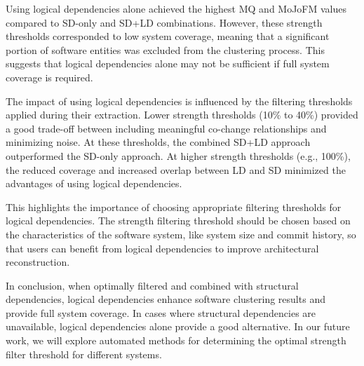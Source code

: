 \documentclass{ieeeaccess}
\begin{document}
Using logical dependencies alone achieved the highest MQ and MoJoFM values compared to SD-only and SD+LD combinations. However, these strength thresholds corresponded to low system coverage, meaning that a significant portion of software entities was excluded from the clustering process. This suggests that logical dependencies alone may not be sufficient if full system coverage is required.

The impact of using logical dependencies is influenced by the filtering thresholds applied during their extraction. Lower strength thresholds (10\% to 40\%) provided a good trade-off between including meaningful co-change relationships and minimizing noise. At these thresholds, the combined SD+LD approach outperformed the SD-only approach. At higher strength thresholds (e.g., 100\%), the reduced coverage and increased overlap between LD and SD minimized the advantages of using logical dependencies.

This highlights the importance of choosing appropriate filtering thresholds for logical dependencies. The strength filtering threshold should be chosen based on the characteristics of the software system, like system size and commit history, so that users can benefit from logical dependencies to improve architectural reconstruction.

In conclusion, when optimally filtered and combined with structural dependencies, logical dependencies enhance software clustering results and provide full system coverage. In cases where structural dependencies are unavailable, logical dependencies alone provide a good alternative. In our future work, we will explore automated methods for determining the optimal strength filter threshold for different systems.
\end{document}
